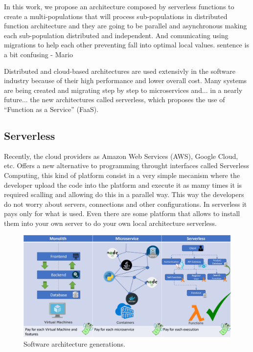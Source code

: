 \documentclass[runningheads]{llncs}
\begin{document}
In this work, we propose an architecture composed by serverless functions to
create a multi-populations that will process sub-populations in distributed
function architecture and they are going to be parallel and asynchronous making
each sub-population distributed and independent. And comunicating using
migrations to help each other preventing fall into optimal local values. %
sentence is a bit confusing - Mario

Distributed and cloud-based architectures are used extensivly in the software
industry because of their high performance and lower overall cost.  Many systems
are being created and migrating step by step to microservices and... in a nearly
future... the new architectures called serverless, which proposes the use of
“Function as a Service” (FaaS).

\subsection{Serverless}
Recently, the cloud providers as Amazon Web Services (AWS), Google Cloud, etc.
Offers a new alternative to programming throught interfaces called Serverless
Computing, this kind of platform consist in a very simple mecanism where the
developer upload the code into the platform and execute it as mamy times it is
required scalling and allowing do this in a parallel way. This way the
developers do not worry about servers, connections and other configurations. In
serverless it pays only for what is used. Even there are some platform that
allows to install them into your own server to do your own local architecture
serverless.

\begin{figure}[htp]
  \includegraphics[width=\textwidth]{img/architectures.png}
  \caption{Software architecture generations.} \label{fig1}
  \end{figure}
\end{document}
